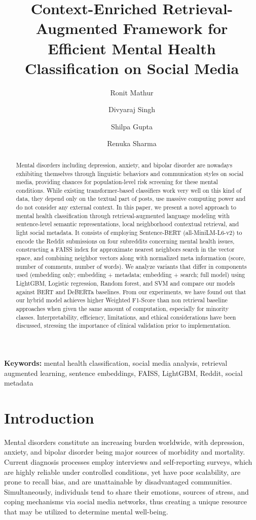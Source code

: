 \documentclass[11pt]{article}
\title{Context-Enriched Retrieval-Augmented Framework for Efficient Mental Health Classification on Social Media}
\author[1]{Ronit Mathur}
\author[2]{Divyaraj Singh}
\author[3]{Shilpa Gupta}
\author[4]{Renuka Sharma}
\affil[1,2,3,4]{Department of Computer Science, JIMS Engineering Management Technical Campus, Greater Noida, India\\
}
\date{}
\begin{document}
\maketitle


\begin{abstract}
Mental disorders including depression, anxiety, and bipolar disorder are nowadays exhibiting themselves through linguistic behaviors and communication styles on social media, providing chances for population-level risk screening for these mental conditions. While existing transformer-based classifiers work very well on this kind of data, they depend only on the textual part of posts, use massive computing power and do not consider any external context. In this paper, we present a novel approach to mental health classification through retrieval-augmented language modeling with sentence-level semantic representations, local neighborhood contextual retrieval, and light social metadata. It consists of employing Sentence-BERT (all-MiniLM-L6-v2) to encode the Reddit submissions on four subreddits concerning mental health issues, constructing a FAISS index for approximate nearest neighbors search in the vector space, and combining neighbor vectors along with normalized meta information (score, number of comments, number of words). We analyze variants that differ in components used (embedding only; embedding + metadata; embedding + search; full model) using LightGBM, Logistic regression, Random forest, and SVM and compare our models against BERT and DeBERTa baselines. From our experiments, we have found out that our hybrid model achieves higher Weighted F1-Score than non retrieval baseline approaches when given the same amount of computation, especially for minority classes. Interpretability, efficiency, limitations, and ethical considerations have been discussed, stressing the importance of clinical validation prior to implementation.
\end{abstract}

\textbf{Keywords:} mental health classification, social media analysis, retrieval augmented learning, sentence embeddings, FAISS, LightGBM, Reddit, social metadata

\section{Introduction}

Mental disorders constitute an increasing burden worldwide, with depression, anxiety, and bipolar disorder being major sources of morbidity and mortality. Current diagnosis processes employ interviews and self-reporting surveys, which are highly reliable under controlled conditions, yet have poor scalability, are prone to recall bias, and are unattainable by disadvantaged communities. Simultaneously, individuals tend to share their emotions, sources of stress, and coping mechanisms via social media networks, thus creating a unique resource that may be utilized to determine mental well-being.
\end{document}
